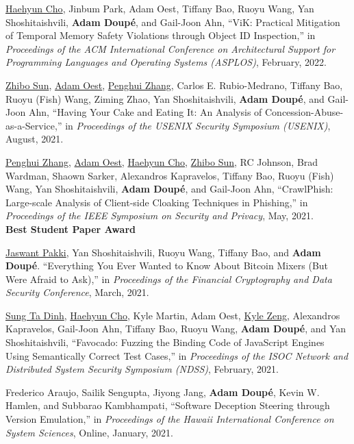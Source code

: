 \documentclass[11pt,letterpaper,sans]{moderncv}
\begin{document}
\begin{etaremune}
\item \underline{Haehyun Cho}, Jinbum Park, Adam Oest, Tiffany Bao,  Ruoyu Wang,  Yan Shoshitaishvili,  \textbf{Adam Doup\'e}, and  Gail-Joon Ahn, ``ViK: Practical Mitigation of Temporal Memory Safety Violations through Object ID Inspection,'' in \emph{Proceedings of the ACM International Conference on Architectural Support for Programming Languages and Operating Systems (ASPLOS)}, February, 2022.

\item \underline{Zhibo Sun}, \underline{Adam Oest}, \underline{Penghui Zhang}, Carlos E. Rubio-Medrano, Tiffany Bao, Ruoyu (Fish) Wang, Ziming Zhao, Yan Shoshitaishvili, \textbf{Adam Doup\'e}, and Gail-Joon Ahn, ``Having Your Cake and Eating It: An Analysis of Concession-Abuse-as-a-Service,'' in \emph{Proceedings of the USENIX Security Symposium (USENIX)}, August, 2021.

\item \underline{Penghui Zhang}, \underline{Adam Oest}, \underline{Haehyun Cho}, \underline{Zhibo Sun}, RC Johnson, Brad Wardman, Shaown Sarker, Alexandros Kapravelos, Tiffany Bao, Ruoyu (Fish) Wang, Yan Shoshitaishvili, \textbf{Adam Doup\'e}, and Gail-Joon Ahn, ``CrawlPhish: Large-scale Analysis of Client-side Cloaking Techniques in Phishing,'' in \emph{Proceedings of the IEEE Symposium on Security and Privacy}, May, 2021. \\
  \textbf{Best Student Paper Award}

\item \underline{Jaswant Pakki}, Yan Shoshitaishvili, Ruoyu Wang, Tiffany Bao, and \textbf{Adam Doup\'e}. ``Everything You Ever Wanted to Know About Bitcoin Mixers (But Were Afraid to Ask),'' in \emph{Proceedings of the Financial Cryptography and Data Security Conference}, March, 2021. 

\item \underline{Sung Ta Dinh}, \underline{Haehyun Cho}, Kyle Martin, Adam Oest, \underline{Kyle Zeng}, Alexandros Kapravelos, Gail-Joon Ahn, Tiffany Bao, Ruoyu Wang, \textbf{Adam Doup\'e}, and Yan Shoshitaishvili, ``Favocado: Fuzzing the Binding Code of JavaScript Engines Using Semantically Correct Test Cases,'' in \emph{Proceedings of the ISOC Network and Distributed System Security Symposium (NDSS)}, February, 2021.

\item Frederico Araujo, Sailik Sengupta, Jiyong Jang, \textbf{Adam Doup\'e}, Kevin W. Hamlen, and Subbarao Kambhampati, ``Software Deception Steering through Version Emulation,'' in \emph{Proceedings of the Hawaii International Conference on System Sciences}, Online, January, 2021.


\end{etaremune}
\end{document}
